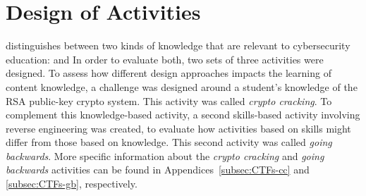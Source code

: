 


\providecommand{\heading}[1]{\section{#1}}
\providecommand{\subheading}[1]{\subsection{#1}}

\heading{Design of Activities}
    \textcite{R-Weiss} distinguishes between two kinds of knowledge that are relevant to cybersecurity education: 
     and  
    In order to evaluate both, two sets of three activities were designed. 
    To assess how different design approaches impacts the learning of content knowledge, a challenge was designed around a student's  knowledge of the RSA public-key crypto system. 
    This activity was called \emph{crypto cracking}. 
    To complement this knowledge-based activity, a second skills-based activity involving reverse engineering was created, to evaluate how activities based on skills might differ from those based on knowledge. 
    This second activity was called \emph{going backwards}. 
    More specific information about the \emph{crypto cracking} and \emph{going backwards} activities can be found in Appendices~\ref{subsec:CTFs-cc} and \ref{subsec:CTFs-gb}, respectively.

